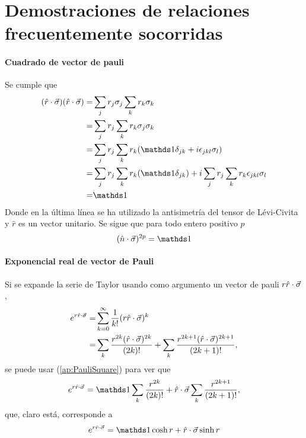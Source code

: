 \chapter{Demostraciones de relaciones frecuentemente socorridas}

\subsubsection{Cuadrado de vector de pauli}
Se cumple que
\begin{align}
    (\paulivec{r})(\paulivec{r})=&\sum_{j}r_{j}\pauli{j}\sum_{k}r_{k}\pauli{k}\nonumber\\
    =&\sum_{j}r_{j}\sum_{k}r_{k}\pauli{j}\pauli{k}\nonumber\\
    =&\sum_{j}r_{j}\sum_{k}r_{k}(\Id\delta_{jk}+i\epsilon_{jkl}\pauli{l})\nonumber\\
    =&\sum_{j}r_{j}\sum_{k}r_{k}(\Id\delta_{jk})+i\sum_{j}r_{j}\sum_{k}r_{k}\epsilon_{jkl}\pauli{l}\nonumber\\
    =&\Id\nonumber
\end{align}
Donde en la última línea se ha utilizado la antisimetría del tensor de Lévi-Civita y $\hat{r}$ es un vector unitario. Se sigue que para todo entero positivo $p$
\begin{equation}\label{ap:PauliSquare}
    (\paulivec{n})^{2p}=\Id
\end{equation}

\subsubsection{Exponencial real de vector de Pauli}
Si se expande la serie de Taylor usando como argumento un vector de pauli $r\hat{r}\cdot\vec{\sigma}$,
\begin{align}
    e^{r\hat{r}\cdot\vec{\sigma}}=&\sum_{k=0}^{\infty}\frac{1}{k!}(r\hat{r}\cdot\vec{\sigma})^k\nonumber\\
    =&\sum_{k}\frac{r^{2k}(\hat{r}\cdot\vec{\sigma})^{2k}}{(2k)!}+\sum_{k}\frac{r^{2k+1}(\hat{r}\cdot\vec{\sigma})^{2k+1}}{(2k+1)!},\nonumber
\end{align}
se puede usar (\ref{ap:PauliSquare}) para ver que
\begin{equation}
    e^{r\paulivec{r}}=\Id\sum_{k}\frac{r^{2k}}{(2k)!}+\paulivec{r}\sum_{k}\frac{r^{2k+1}}{(2k+1)!},\nonumber
\end{equation}
que, claro está, corresponde a
\begin{equation}\label{ap:PauliRealExp}
    e^{r\paulivec{r}}=\Id\cosh{r}+\paulivec{r}\sinh{r}
\end{equation}


